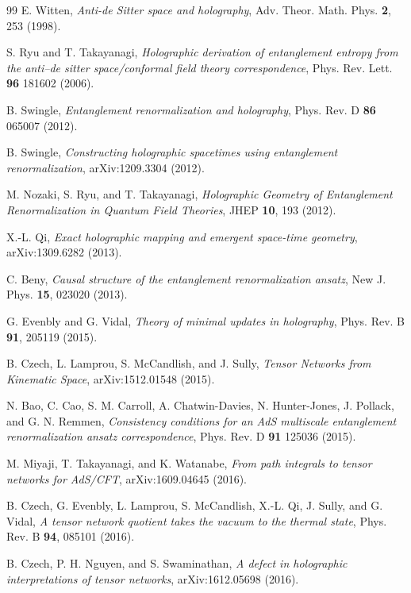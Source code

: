 \documentclass[aps,prl,twocolumn,showpacs,superscriptaddress,floatfix,10pt]{revtex4-1}
\begin{document}
\begin{thebibliography}{99}
E. Witten, {\it Anti-de Sitter space and holography}, Adv. Theor. Math. Phys. \textbf{2}, 253 (1998).

S. Ryu and T. Takayanagi, {\it Holographic derivation of entanglement entropy from the anti--de sitter space/conformal field theory correspondence}, Phys. Rev. Lett. {\bf 96} 181602 (2006).


B. Swingle, {\it Entanglement renormalization and holography}, Phys. Rev. D {\bf 86} 065007 (2012).

B. Swingle, {\it Constructing holographic spacetimes using entanglement renormalization}, arXiv:1209.3304 (2012).


M. Nozaki, S. Ryu, and T. Takayanagi, {\it Holographic Geometry of Entanglement Renormalization
in Quantum Field Theories}, JHEP \textbf{10}, 193 (2012).

X.-L. Qi, {\it Exact holographic mapping and emergent space-time geometry}, arXiv:1309.6282 (2013).

C. Beny, {\it Causal structure of the entanglement renormalization ansatz}, New J. Phys.
\textbf{15}, 023020 (2013). 

G. Evenbly and G. Vidal, {\it Theory of minimal updates in holography}, Phys. Rev. B {\bf 91}, 205119 (2015).

B. Czech, L. Lamprou, S. McCandlish, and J. Sully, {\it Tensor Networks from Kinematic Space}, arXiv:1512.01548 (2015).

N. Bao, C. Cao, S. M. Carroll, A. Chatwin-Davies, N. Hunter-Jones, J. Pollack, and G. N. Remmen, {\it Consistency conditions for an AdS multiscale entanglement
renormalization ansatz correspondence}, Phys. Rev. D {\bf 91} 125036 (2015).

M. Miyaji, T. Takayanagi, and K. Watanabe, {\it From path integrals to tensor networks for AdS/CFT}, arXiv:1609.04645 (2016).

B. Czech, G. Evenbly, L. Lamprou, S. McCandlish, X.-L. Qi, J. Sully, and G. Vidal, {\it A tensor network quotient takes the vacuum to the thermal state}, Phys. Rev. B {\bf 94}, 085101 (2016).

B. Czech, P. H. Nguyen, and S. Swaminathan, {\it A defect in holographic interpretations of tensor networks}, arXiv:1612.05698 (2016).


\end{thebibliography}
\end{document}
